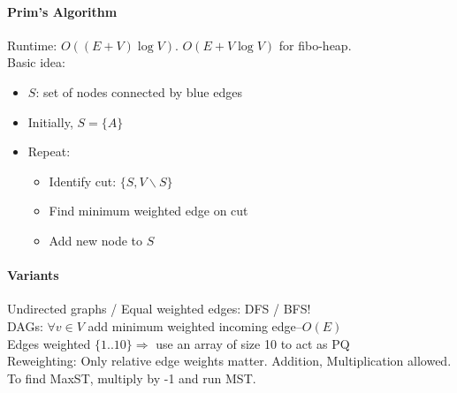 \paragraph{Prim's Algorithm}
\textcolor{Bittersweet}{Runtime}: $O((E+V)\log V)$. $O(E + V\log V)$ for fibo-heap.\\
Basic idea:
\begin{itemize}
  \item $S$: set of nodes connected by blue edges
  \item Initially, $S=\{A\}$
  \item Repeat:
    \begin{itemize}
      \item Identify cut: $\{S, V\backslash S\}$
      \item Find minimum weighted edge on cut
      \item Add new node to $S$
    \end{itemize}
\end{itemize}
\paragraph{Variants}
Undirected graphs / Equal weighted edges: DFS / BFS!\\
DAGs: $\forall v\in V$ add minimum weighted incoming edge–$O(E)$\\
Edges weighted $\{1..10\}\Rightarrow$ use an array of size 10 to act as PQ\\
Reweighting: Only relative edge weights matter. Addition, Multiplication
allowed. To find MaxST, multiply by -1 and run MST.\@
